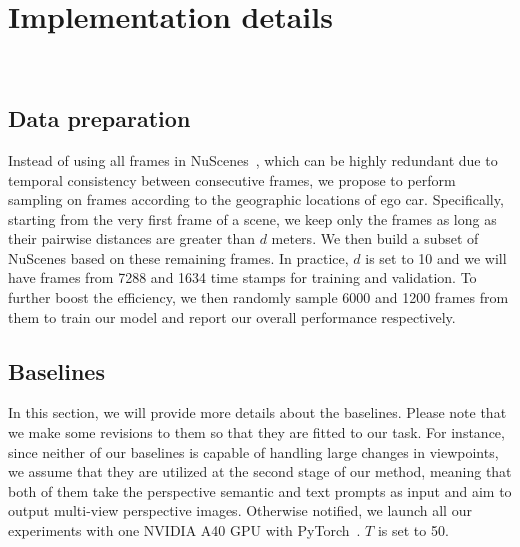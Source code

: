 \documentclass[sigconf]{acmart}
\begin{document}

\section{Implementation details}~\label{sec:im_detail}
\subsection{Data preparation} Instead of using all frames in NuScenes~\cite{caesar2020nuscenes}, which can be highly redundant due to temporal consistency between consecutive frames, we propose to perform sampling on frames according to the geographic locations of ego car. Specifically, starting from the very first frame of a scene, we keep only the frames as long as their pairwise distances are greater than $d$ meters. We then build a subset of NuScenes based on these remaining frames. In practice, $d$ is set to 10 and we will have frames from 7288 and 1634 time stamps for training and validation. To further boost the efficiency, we then randomly sample 6000 and 1200 frames from them to train our model and report our overall performance respectively.


\subsection{Baselines}
In this section, we will provide more details about the baselines. Please note that we make some revisions to them so that they are fitted to our task. For instance, since neither of our baselines is capable of handling large changes in viewpoints, we assume that they are utilized at the second stage of our method, meaning that both of them take the perspective semantic and text prompts as input and aim to output multi-view perspective images. Otherwise notified, we launch all our experiments with one NVIDIA A40 GPU with PyTorch~\cite{paszke2019pytorch}. $T$ is set to 50.
\end{document}
